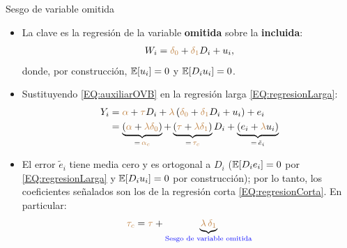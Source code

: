 \documentclass[9pt, xcolor=dvipsnames]{beamer}
\begin{document}
\begin{frame}{Sesgo de variable omitida}
\begin{itemize}
    \item La clave es la regresión de la variable \textbf{omitida} sobre la \textbf{incluida}:
    \begin{align}\label{EQ:auxiliarOVB}
        W_i = \textcolor{brown}{\delta_0} + \textcolor{brown}{\delta_1} D_i + u_i,
    \end{align}
    donde, por construcción, \(\operatorname{\mathbb{E}}[u_i] = 0\) y \(\operatorname{\mathbb{E}}[D_i u_i] = 0\).
    \item Sustituyendo \eqref{EQ:auxiliarOVB} en la regresión larga \eqref{EQ:regresionLarga}:
    \begin{align*}
    \begin{split}
        Y_i &= \textcolor{brown}{\alpha} + \textcolor{brown}{\tau} D_i + \textcolor{brown}{\lambda} \left(\textcolor{brown}{\delta_0} + \textcolor{brown}{\delta_1} D_i + u_i\right) + e_i \\
            &= \underbrace{\left(\textcolor{brown}{\alpha} + \textcolor{brown}{\lambda}\textcolor{brown}{\delta_0}\right)}_{=\, \textcolor{brown}{\alpha_c}} + \underbrace{\left(\textcolor{brown}{\tau} + \textcolor{brown}{\lambda}\textcolor{brown}{\delta_1}\right)}_{=\, \textcolor{brown}{\tau_c}} D_i + \underbrace{\left(e_i + \textcolor{brown}{\lambda} u_i\right)}_{=\, \tilde{e}_i}
    \end{split}
    \end{align*}
    \item El error \(\tilde{e}_i\) tiene media cero y es ortogonal a \(D_i\) (\(\operatorname{\mathbb{E}}[D_i e_i] = 0\) por \eqref{EQ:regresionLarga} y \(\operatorname{\mathbb{E}}[D_i u_i] = 0\) por construcción); por lo tanto, los coeficientes señalados son los de la regresión corta \eqref{EQ:regresionCorta}. En particular:
    \begin{align*}
        \textcolor{brown}{\tau_c} = \textcolor{brown}{\tau} + \underbrace{\textcolor{brown}{\lambda} \, \textcolor{brown}{\delta_1}}_{\textcolor{blue}{\text{Sesgo de variable omitida}}}
    \end{align*}
\end{itemize}
\end{frame}
\end{document}
